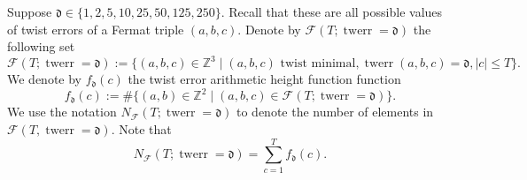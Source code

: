 \documentclass[12pt]{amsart}
\numberwithin{equation}{section} %
\theoremstyle{definition} \newtheorem{definition}[counter]{Definition}
\theoremstyle{remark} \newtheorem{nonexam}[counter]{Non-example}
\newcommand{\FF}{\mathscr{F}} %
\DeclareMathOperator{\twerr}{twerr} %
\begin{document}
Suppose $\mathfrak{d} \in \{1, 2, 5, 10, 25, 50, 125, 250\}$. Recall that these are all possible values of twist errors of a Fermat triple $(a,b,c)$. Denote by $\FF(T; \twerr = \mathfrak{d})$ the following set
\begin{equation*}
    \FF(T; \twerr = \mathfrak{d}) := \{(a,b,c) \in \mathbb{Z}^3 \; | \; (a,b,c) \text{ twist minimal}, \twerr(a,b,c) = \mathfrak{d}, |c| \leq T\}.
\end{equation*}
We denote by $f_{\mathfrak{d}}(c)$ the twist error arithmetic height function function
\begin{equation*}
    f_{\mathfrak{d}}(c) := \# \{(a,b) \in \mathbb{Z}^2 \; | \; (a,b,c) \in \FF(T; \twerr = \mathfrak{d})\}.
\end{equation*}
We use the notation $N_{\FF}(T; \twerr=\mathfrak{d})$ to denote the number of elements in $\FF(T, \twerr = \mathfrak{d})$. Note that
\begin{equation*}
    N_{\FF}(T; \twerr = \mathfrak{d}) = \sum_{c = 1}^T f_{\mathfrak{d}}(c).
\end{equation*}
\end{document}
